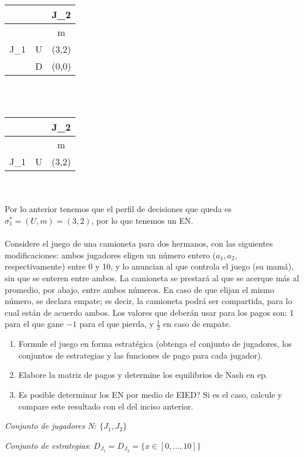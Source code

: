 \documentclass{homework}
\begin{document}
\begin{tabular}{| c | c |c |}
\hline
& &J_2 \\ \hline
 &  & m \\\hline
J_1 & U & (3,2) \\\hline
 & D & (0,0) \\\hline
\end{tabular}\\\\

\begin{tabular}{| c | c |c |}
\hline
& &J_2 \\ \hline
 &  & m \\\hline
J_1 & U & (3,2) \\\hline
\end{tabular}\\\\

Por lo anterior tenemos que el perfil de decisiones que queda es $\sigma_1^*= (U,m)= (3,2)$, por lo que tenemos un EN.\\\\

\question Considere el juego de una camioneta para dos hermanos, con las siguientes modificaciones: ambos jugadores eligen un número entero ($a_1, a_2$, respectivamente) entre 0 y 10, y lo anuncian al que controla el juego (su mamá), sin que se enteren entre ambos. La camioneta se prestará al que se acerque más al promedio, por abajo, entre ambos números. En caso de que elijan el mismo número, se declara empate; es decir, la camioneta podrá ser compartida, para lo cual están de acuerdo ambos. Los valores que deberán usar para los pagos son: 1 para el que gane $-1$ para el que pierda, y $\frac{1}{2}$ en caso de empate.

\begin{enumerate}
    \item Formule el juego en forma estratégica (obtenga el conjunto de jugadores, los conjuntos de estrategias y las funciones de pago para cada jugador).
    \item Elabore la matriz de pagos y determine los equilibrios de Nash en ep.
    \item Es posible determinar los EN por medio de EIED? Si es el caso, calcule y compare este resultado con el del inciso anterior.
\end{enumerate}

\emph{Conjunto de jugadores $N$}: $\{ J_1, J_2 \}$

\emph{Conjunto de estrategias}: $D_{J_1} =   D_{J_2} = \{ x \in [0, \dots, 10] \}$
\end{document}
